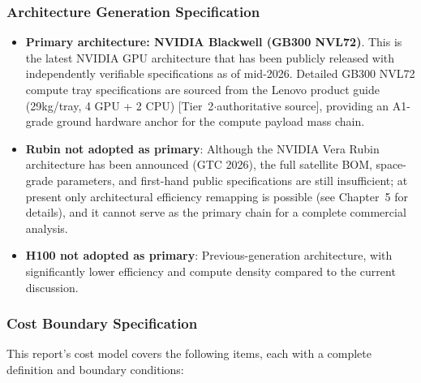 \subsubsection{Architecture Generation Specification}

\begin{itemize}[leftmargin=*]
    \item \textbf{Primary architecture: NVIDIA Blackwell (GB300 NVL72)}. This is the latest NVIDIA GPU architecture that has been publicly released with independently verifiable specifications as of mid-2026. Detailed GB300 NVL72 compute tray specifications are sourced from the Lenovo product guide (29\;kg/tray, 4 GPU + 2 CPU) [Tier~2$\cdot$authoritative source]\cite{lenovo2025gb300}, providing an A1-grade ground hardware anchor for the compute payload mass chain.
    \item \textbf{Rubin not adopted as primary}: Although the NVIDIA Vera Rubin architecture has been announced (GTC 2026), the full satellite BOM, space-grade parameters, and first-hand public specifications are still insufficient; at present only architectural efficiency remapping is possible (see Chapter~5 for details), and it cannot serve as the primary chain for a complete commercial analysis.
    \item \textbf{H100 not adopted as primary}: Previous-generation architecture, with significantly lower efficiency and compute density compared to the current discussion.
\end{itemize}

\subsubsection{Cost Boundary Specification}

This report's cost model covers the following items, each with a complete definition and boundary conditions:

